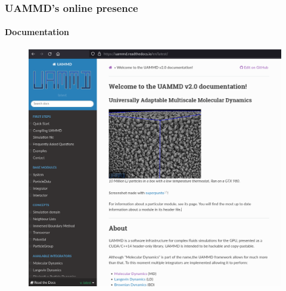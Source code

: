 \documentclass[xcolor=dvipsnames]{beamer}
\begin{document}
\begin{frame}
  \frametitle{UAMMD's online presence}
  \framesubtitle{Documentation}
  {}
  \begin{figure}
    \centering
    \includegraphics[height=0.7\paperheight]{gfx/uammdreadthedocs}
  \end{figure}
\end{frame}
\end{document}
